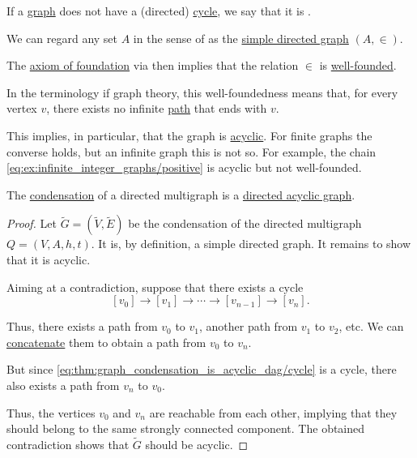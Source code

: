 \begin{definition}\label{def:acyclic_graph}
  If a \hyperref[rem:arbitrary_graph]{graph} does not have a (directed) \hyperref[def:graph_cycle]{cycle}, we say that it is .
\end{definition}

\begin{example}\label{ex:well_founded_graphs}
  We can regard any set \( A \) in the sense of \hyperref[def:zfc]{} as the \hyperref[def:directed_graph]{simple directed graph} \( (A, \in) \).

  The \hyperref[def:zfc/foundation]{axiom of foundation} via  then implies that the relation \( \in \) is \hyperref[rem:well_founded_relation]{well-founded}.

  In the terminology if graph theory, this well-foundedness means that, for every vertex \( v \), there exists no infinite \hyperref[def:graph_walk/path]{path} that ends with \( v \).

  This implies, in particular, that the graph is \hyperref[def:acyclic_graph]{acyclic}. For finite graphs the converse holds, but an infinite graph this is not so. For example, the chain \eqref{eq:ex:infinite_integer_graphs/positive} is acyclic but not well-founded.
\end{example}

\begin{proposition}\label{thm:graph_condensation_is_acyclic_dag}
  The \hyperref[def:directed_graph_condensation]{condensation} of a directed multigraph is a \hyperref[def:acyclic_graph]{directed acyclic graph}.
\end{proposition}
\begin{proof}
  Let \( \widetilde{G} = (\widetilde{V}, \widetilde{E}) \) be the condensation of the directed multigraph \( Q = (V, A, h, t) \). It is, by definition, a simple directed graph. It remains to show that it is acyclic.

  Aiming at a contradiction, suppose that there exists a cycle
  \begin{equation}\label{eq:thm:graph_condensation_is_acyclic_dag/cycle}
    [v_0] \to [v_1] \to \cdots \to [v_{n-1}] \to [v_n].
  \end{equation}

  Thus, there exists a path from \( v_0 \) to \( v_1 \), another path from \( v_1 \) to \( v_2 \), etc. We can \hyperref[def:graph_walk/concatenation]{concatenate} them to obtain a path from \( v_0 \) to \( v_n \).

  But since \eqref{eq:thm:graph_condensation_is_acyclic_dag/cycle} is a cycle, there also exists a path from \( v_n \) to \( v_0 \).

  Thus, the vertices \( v_0 \) and \( v_n \) are reachable from each other, implying that they should belong to the same strongly connected component. The obtained contradiction shows that \( \widetilde{G} \) should be acyclic.
\end{proof}
